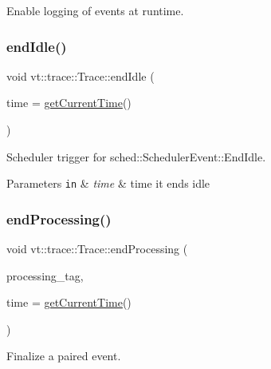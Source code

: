 Enable logging of events at runtime. 

\mbox{\label{structvt_1_1trace_1_1_trace_a0262f4025460c9d61cac60420e75ef77}} 
\subsubsection{\texorpdfstring{end\+Idle()}{endIdle()}}
{\footnotesize\ttfamily void vt\+::trace\+::\+Trace\+::end\+Idle (\begin{DoxyParamCaption}\item[{double const}]{time = {\ttfamily \hyperlink{structvt_1_1trace_1_1_trace_a04cf6b76b4ced1bc90d246a34c948db5}{get\+Current\+Time}()} }\end{DoxyParamCaption})}



Scheduler trigger for {\ttfamily sched\+::\+Scheduler\+Event\+::\+End\+Idle}. 


\begin{DoxyParams}[1]{Parameters}
\mbox{\tt in}  & {\em time} & time it ends idle \\
\hline
\end{DoxyParams}
\mbox{\label{structvt_1_1trace_1_1_trace_a18f66e844acc133fce37c2c9d9f939e0}} 
\subsubsection{\texorpdfstring{end\+Processing()}{endProcessing()}}
{\footnotesize\ttfamily void vt\+::trace\+::\+Trace\+::end\+Processing (\begin{DoxyParamCaption}\item[{\hyperlink{structvt_1_1trace_1_1_trace_processing_tag}{Trace\+Processing\+Tag} const \&}]{processing\+\_\+tag,  }\item[{double const}]{time = {\ttfamily \hyperlink{structvt_1_1trace_1_1_trace_a04cf6b76b4ced1bc90d246a34c948db5}{get\+Current\+Time}()} }\end{DoxyParamCaption})}



Finalize a paired event. 

